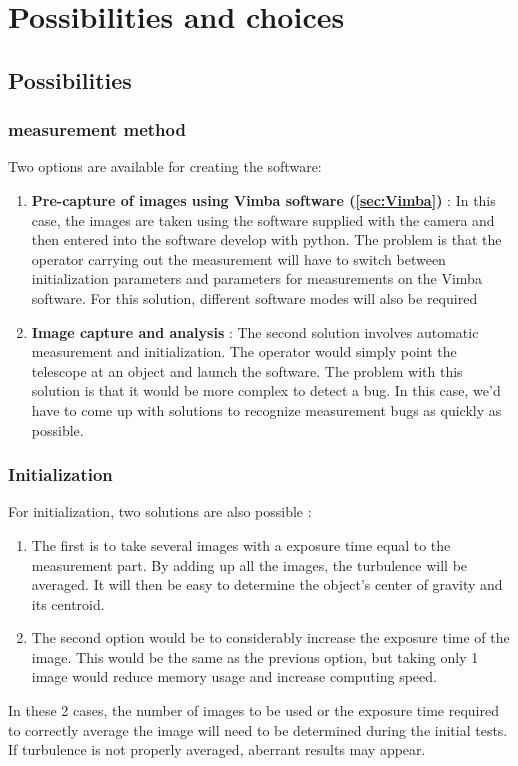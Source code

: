 \section{Possibilities and choices}
\subsection{Possibilities}
\subsubsection{measurement method}
Two options are available for creating the software:
\begin{enumerate}
    \item \textbf{Pre-capture of images using Vimba software (\ref{sec:Vimba})} : \newline
    In this case, the images are taken using the software supplied with the camera and then entered into the software develop with python.
    The problem is that the operator carrying out the measurement will have to switch between initialization parameters and parameters 
    for measurements on the Vimba software. For this solution, different software modes will also be required 
    \item \textbf{Image capture and analysis} :\newline
    The second solution involves automatic measurement and initialization. The operator would simply point the telescope at an 
    object and launch the software. The problem with this solution is that it would be more complex to detect a bug. In this case, 
    we'd have to come up with solutions to recognize measurement bugs as quickly as possible.
\end{enumerate}
\subsubsection{Initialization}
For initialization, two solutions are also possible :
\begin{enumerate}
    \item The first is to take several images with a exposure time equal to the measurement part. By adding up all the images, 
    the turbulence will be averaged. It will then be easy to determine the object's center of gravity and its centroid.
    \item The second option would be to considerably increase the exposure time of the image. This would be the same as the 
    previous option, but taking only 1 image would reduce memory usage and increase computing speed.
\end{enumerate}
In these 2 cases, the number of images to be used or the exposure time required to correctly average the image will need to 
be determined during the initial tests. If turbulence is not properly averaged, aberrant results may appear.
